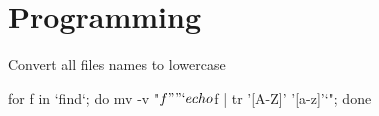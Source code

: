 \chapter{Programming}

Convert all files names to lowercase

\begin{term}
for f in `find`; do mv -v "$f" "`echo $f | tr '[A-Z]' '[a-z]'`"; done
\end{term}

